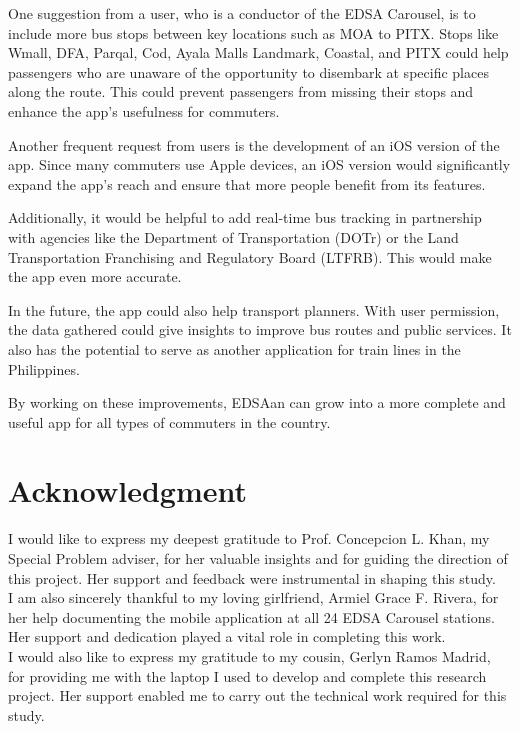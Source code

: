 \documentclass[journal]{./IEEE/IEEEtran}
\begin{document}
One suggestion from a user, who is a conductor of the EDSA Carousel, is to include more bus stops between key locations such as MOA to PITX. Stops like Wmall, DFA, Parqal, Cod, Ayala Malls Landmark, Coastal, and PITX could help passengers who are unaware of the opportunity to disembark at specific places along the route. This could prevent passengers from missing their stops and enhance the app's usefulness for commuters.

Another frequent request from users is the development of an iOS version of the app. Since many commuters use Apple devices, an iOS version would significantly expand the app’s reach and ensure that more people benefit from its features.

Additionally, it would be helpful to add real-time bus tracking in partnership with agencies like the Department of Transportation (DOTr) or the Land Transportation Franchising and Regulatory Board (LTFRB). This would make the app even more accurate.

In the future, the app could also help transport planners. With user permission, the data gathered could give insights to improve bus routes and public services. It also has the potential to serve as another application for train lines in the Philippines.

By working on these improvements, EDSAan can grow into a more complete and useful app for all types of commuters in the country.





\section*{Acknowledgment}
I would like to express my deepest gratitude to Prof. Concepcion L. Khan, my Special Problem adviser, for her valuable insights and for guiding the direction of this project. Her support and feedback were instrumental in shaping this study. \hfill \\

I am also sincerely thankful to my loving girlfriend, Armiel Grace F. Rivera, for her help documenting the mobile application at all 24 EDSA Carousel stations. Her support and dedication played a vital role in completing this work. \hfill \\

I would also like to express my gratitude to my cousin, Gerlyn Ramos Madrid, for providing me with the laptop I used to develop and complete this research project. Her support enabled me to carry out the technical work required for this study. \hfill \\\
\end{document}
